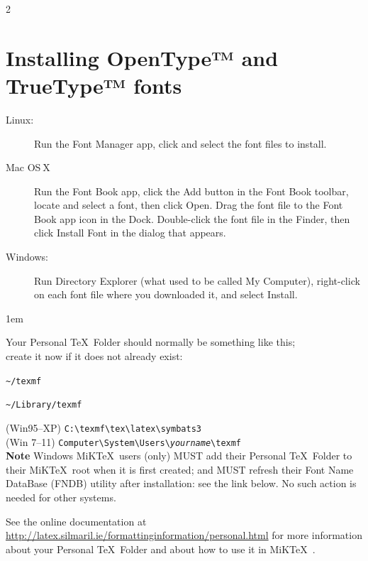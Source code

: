 \documentclass{article}
\begin{document}
\begin{multicols*}{2}
\printbibliography


\section*{Installing OpenType™ and TrueType™ fonts}

  \begin{description}
    \item[Linux:] Run the \textsf{Font Manager} app, click
      \keys{\texttt{+}} and select the font files to install.
    \item[Mac OS X] Run the \textsf{Font Book} app, click the
      \textsf{Add} button in the Font Book toolbar, locate and select
      a font, then click \textsf{Open}. Drag the font file to the Font
      Book app icon in the Dock. Double-click the font file in the
      Finder, then click \textsf{Install Font} in the dialog that
      appears.
    \item[Windows:] Run \textsf{Directory Explorer} (what used to be
      called \textsf{My Computer}), right-click on
      each font file where you downloaded it, and select \textsf{Install}.
  \end{description}


  \begingroup
  \fboxsep1em
  \begin{Sbox}
    \begin{minipage}{.9\hsize}
      \raggedright\sffamily
      Your Personal \TeX\ Folder should normally be something like this;\\
      create it now if it does not already exist:
      \par\smallskip
      \begin{description}[noitemsep,leftmargin=1em,font=\sffamily]
      \item[Linux:] \verb+~/texmf+
      \item[Mac OS\thinspace X:]
        \verb+~/Library/texmf+
      \item[Windows:] (\textsf{Win95–XP})
        \verb+C:\texmf\tex\latex\symbats3+\\
        (\textsf{Win 7–11})
        \verb+Computer\System\Users\+\texttt{\itshape yourname}\verb+\texmf+
        \\[2mm]
        \textbf{Note} Windows MiK\TeX\ users (only) \textsf{\smaller
          MUST} add their Personal \TeX\ Folder to their MiK\TeX\ root
        when it is first created; and \textsf{\smaller MUST} refresh their
        Font Name DataBase (FNDB) utility after installation: see the
        link below. No such action is needed for other systems.
      \end{description}
      \par\smallskip
      See the online documentation at
      \url{http://latex.silmaril.ie/formattinginformation/personal.html}
      for more information about your
      Personal \TeX\ Folder and about how to use it in MiK\TeX\ \parencite{fi}.
    \end{minipage}
  \end{Sbox}
  \fbox{\TheSbox}
  \endgroup\label{ptf}

\end{multicols*}
\end{document}
